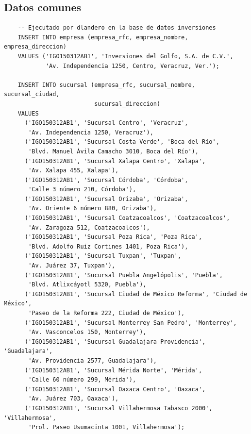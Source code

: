 \subsection{Datos comunes}

\begin{verbatim}
	-- Ejecutado por dlandero en la base de datos inversiones
	INSERT INTO empresa (empresa_rfc, empresa_nombre, empresa_direccion)
	VALUES ('IGO150312AB1', 'Inversiones del Golfo, S.A. de C.V.',
	        'Av. Independencia 1250, Centro, Veracruz, Ver.');

	INSERT INTO sucursal (empresa_rfc, sucursal_nombre, sucursal_ciudad,
	                      sucursal_direccion)
	VALUES
	  ('IGO150312AB1', 'Sucursal Centro', 'Veracruz',
	   'Av. Independencia 1250, Veracruz'),
	  ('IGO150312AB1', 'Sucursal Costa Verde', 'Boca del Río',
	   'Blvd. Manuel Ávila Camacho 3010, Boca del Río'),
	  ('IGO150312AB1', 'Sucursal Xalapa Centro', 'Xalapa',
	   'Av. Xalapa 455, Xalapa'),
	  ('IGO150312AB1', 'Sucursal Córdoba', 'Córdoba',
	   'Calle 3 número 210, Córdoba'),
	  ('IGO150312AB1', 'Sucursal Orizaba', 'Orizaba',
	   'Av. Oriente 6 número 880, Orizaba'),
	  ('IGO150312AB1', 'Sucursal Coatzacoalcos', 'Coatzacoalcos',
	   'Av. Zaragoza 512, Coatzacoalcos'),
	  ('IGO150312AB1', 'Sucursal Poza Rica', 'Poza Rica',
	   'Blvd. Adolfo Ruiz Cortines 1401, Poza Rica'),
	  ('IGO150312AB1', 'Sucursal Tuxpan', 'Tuxpan',
	   'Av. Juárez 37, Tuxpan'),
	  ('IGO150312AB1', 'Sucursal Puebla Angelópolis', 'Puebla',
	   'Blvd. Atlixcáyotl 5320, Puebla'),
	  ('IGO150312AB1', 'Sucursal Ciudad de México Reforma', 'Ciudad de México',
	   'Paseo de la Reforma 222, Ciudad de México'),
	  ('IGO150312AB1', 'Sucursal Monterrey San Pedro', 'Monterrey',
	   'Av. Vasconcelos 150, Monterrey'),
	  ('IGO150312AB1', 'Sucursal Guadalajara Providencia', 'Guadalajara',
	   'Av. Providencia 2577, Guadalajara'),
	  ('IGO150312AB1', 'Sucursal Mérida Norte', 'Mérida',
	   'Calle 60 número 299, Mérida'),
	  ('IGO150312AB1', 'Sucursal Oaxaca Centro', 'Oaxaca',
	   'Av. Juárez 703, Oaxaca'),
	  ('IGO150312AB1', 'Sucursal Villahermosa Tabasco 2000', 'Villahermosa',
	   'Prol. Paseo Usumacinta 1001, Villahermosa');


\end{verbatim}
